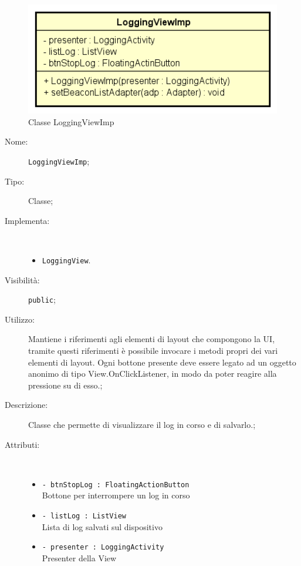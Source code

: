 \documentclass[../DefinizioneDiProdotto.tex]{subfiles}
\begin{document}
    \begin{figure}[H]
        \centering
        \includegraphics{img/LoggingViewImp.png}
        \caption{Classe LoggingViewImp}\label{fig:view::LoggingViewImp} 
    \end{figure}
    \begin{description}
\item[Nome:] \texttt{LoggingViewImp};
\item[Tipo:] Classe;
\item[Implementa:] \
\begin{itemize}
\item \texttt{LoggingView}.

\end{itemize}
\item[Visibilità:] \texttt{public};
\item[Utilizzo:] Mantiene i riferimenti agli elementi di layout che compongono la UI, tramite questi riferimenti è possibile invocare i metodi propri dei vari elementi di layout. Ogni bottone presente deve essere legato ad un oggetto anonimo di tipo View.OnClickListener, in modo da poter reagire alla pressione su di esso.;
\item[Descrizione:] Classe che permette di visualizzare il log in corso e di salvarlo.;
\item[Attributi:] \
\begin{itemize}
\item \texttt{- btnStopLog : FloatingActionButton}\\
Bottone per interrompere un log in corso 

\item \texttt{- listLog : ListView}\\
Lista di log salvati sul dispositivo

\item \texttt{- presenter : LoggingActivity}\\
Presenter della View


\end{itemize}
\end{description}
\end{document}
